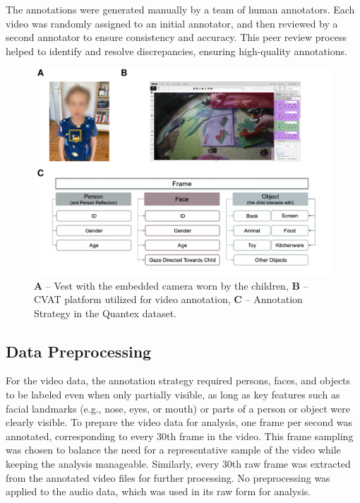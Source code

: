 \documentclass[
  man,floatsintext]{apa6}
\begin{document}
The annotations were generated manually by a team of human annotators. Each video was randomly assigned to an initial annotator, and then reviewed by a second annotator to ensure consistency and accuracy. This peer review process helped to identify and resolve discrepancies, ensuring high-quality annotations.

\begin{figure}

{\centering \includegraphics{Quantex_interaction_paper_files/figure-latex/camera-cvat-activity-classes-1} 

}

\caption{\textbf{A} – Vest with the embedded camera worn by the children, \textbf{B} – CVAT platform utilized for video annotation, \textbf{C} – Annotation Strategy in the Quantex dataset.}\label{fig:camera-cvat-activity-classes}
\end{figure}

\subsection{Data Preprocessing}\label{data-preprocessing}

For the video data, the annotation strategy required persons, faces, and objects to be labeled even when only partially visible, as long as key features such as facial landmarks (e.g., nose, eyes, or mouth) or parts of a person or object were clearly visible. To prepare the video data for analysis, one frame per second was annotated, corresponding to every 30th frame in the video. This frame sampling was chosen to balance the need for a representative sample of the video while keeping the analysis manageable. Similarly, every 30th raw frame was extracted from the annotated video files for further processing. No preprocessing was applied to the audio data, which was used in its raw form for analysis.
\end{document}
